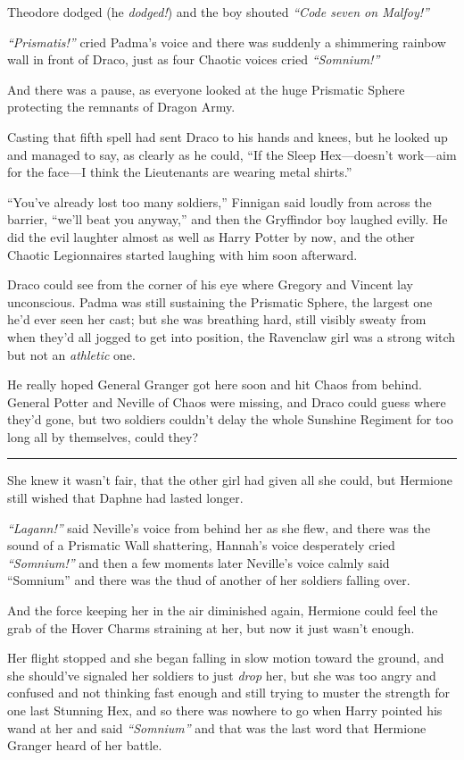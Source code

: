 Theodore dodged (he \emph{dodged!}) and the boy shouted \emph{``Code
seven on Malfoy!''}

\emph{``Prismatis!''} cried Padma's voice and there was suddenly a
shimmering rainbow wall in front of Draco, just as four Chaotic voices
cried \emph{``Somnium!''}

And there was a pause, as everyone looked at the huge Prismatic Sphere
protecting the remnants of Dragon Army.

Casting that fifth spell had sent Draco to his hands and knees, but he
looked up and managed to say, as clearly as he could, ``If the Sleep
Hex---doesn't work---aim for the face---I think the Lieutenants are
wearing metal shirts.''

``You've already lost too many soldiers,'' Finnigan said loudly from
across the barrier, ``we'll beat you anyway,'' and then the Gryffindor
boy laughed evilly. He did the evil laughter almost as well as Harry
Potter by now, and the other Chaotic Legionnaires started laughing with
him soon afterward.

Draco could see from the corner of his eye where Gregory and Vincent lay
unconscious. Padma was still sustaining the Prismatic Sphere, the
largest one he'd ever seen her cast; but she was breathing hard, still
visibly sweaty from when they'd all jogged to get into position, the
Ravenclaw girl was a strong witch but not an \emph{athletic} one.

He really hoped General Granger got here soon and hit Chaos from behind.
General Potter and Neville of Chaos were missing, and Draco could guess
where they'd gone, but two soldiers couldn't delay the whole Sunshine
Regiment for too long all by themselves, could they?

\begin{center}\rule{3in}{0.4pt}\end{center}

She knew it wasn't fair, that the other girl had given all she could,
but Hermione still wished that Daphne had lasted longer.

\emph{``Lagann!''} said Neville's voice from behind her as she flew, and
there was the sound of a Prismatic Wall shattering, Hannah's voice
desperately cried \emph{``Somnium!''} and then a few moments later
Neville's voice calmly said ``Somnium'' and there was the thud of
another of her soldiers falling over.

And the force keeping her in the air diminished again, Hermione could
feel the grab of the Hover Charms straining at her, but now it just
wasn't enough.

Her flight stopped and she began falling in slow motion toward the
ground, and she should've signaled her soldiers to just \emph{drop} her,
but she was too angry and confused and not thinking fast enough and
still trying to muster the strength for one last Stunning Hex, and so
there was nowhere to go when Harry pointed his wand at her and said
\emph{``Somnium''} and that was the last word that Hermione Granger
heard of her battle.
